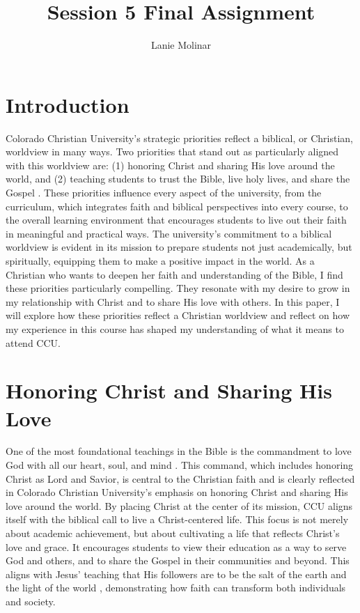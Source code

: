\documentclass[stu,12pt,floatsintext]{apa7}
\title{Session 5 Final Assignment}
\author{Lanie Molinar}
\begin{document}
\maketitle
\thispagestyle{plain}
\pagestyle{plain}

\section{Introduction}
Colorado Christian University's strategic priorities reflect a biblical, or Christian, worldview in many ways. Two priorities that stand out as particularly aligned with this worldview are: (1) honoring Christ and sharing His love around the world, and (2) teaching students to trust the Bible, live holy lives, and share the Gospel \parencite{coloradochristianuniversityStrategicPriorities}. These priorities influence every aspect of the university, from the curriculum, which integrates faith and biblical perspectives into every course, to the overall learning environment that encourages students to live out their faith in meaningful and practical ways. The university's commitment to a biblical worldview is evident in its mission to prepare students not just academically, but spiritually, equipping them to make a positive impact in the world. As a Christian who wants to deepen her faith and understanding of the Bible, I find these priorities particularly compelling. They resonate with my desire to grow in my relationship with Christ and to share His love with others. In this paper, I will explore how these priorities reflect a Christian worldview and reflect on how my experience in this course has shaped my understanding of what it means to attend CCU.
\section{Honoring Christ and Sharing His Love}
One of the most foundational teachings in the Bible is the commandment to love God with all our heart, soul, and mind \parencite[Matthew 22:37]{Tyndale1996}. This command, which includes honoring Christ as Lord and Savior, is central to the Christian faith and is clearly reflected in Colorado Christian University's emphasis on honoring Christ and sharing His love around the world. By placing Christ at the center of its mission, CCU aligns itself with the biblical call to live a Christ-centered life. This focus is not merely about academic achievement, but about cultivating a life that reflects Christ’s love and grace. It encourages students to view their education as a way to serve God and others, and to share the Gospel in their communities and beyond. This aligns with Jesus’ teaching that His followers are to be the salt of the earth and the light of the world \parencite[Matthew 5:13–16]{Tyndale1996}, demonstrating how faith can transform both individuals and society.
\end{document}
